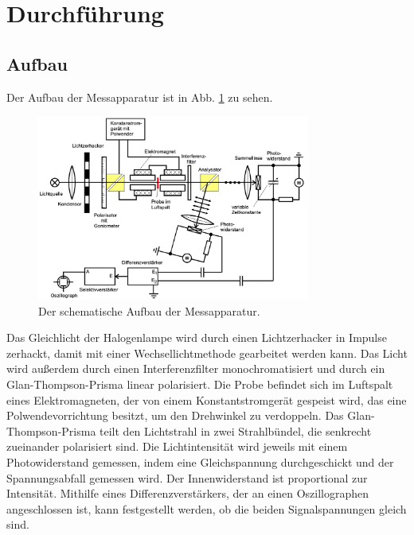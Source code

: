 \section{Durchführung}
\label{sec:Durchführung}

\subsection{Aufbau}
Der Aufbau der Messapparatur ist in Abb. \ref{fig:Aufbau} zu sehen.
\begin{figure}
    \centering
    \includegraphics[width=0.8\textwidth]{fotos/Aufbau.png}
    \caption{Der schematische Aufbau der Messapparatur. \cite{V46}}
    \label{fig:Aufbau}
\end{figure}
Das Gleichlicht der Halogenlampe wird durch einen Lichtzerhacker in Impulse zerhackt, damit mit einer Wechsellichtmethode gearbeitet werden kann. Das Licht wird außerdem durch einen Interferenzfilter monochromatisiert und durch ein Glan-Thompson-Prisma linear polarisiert. Die Probe befindet sich im Luftspalt eines Elektromagneten, der von einem Konstantstromgerät gespeist wird, das eine Polwendevorrichtung besitzt, um den Drehwinkel zu verdoppeln. Das Glan-Thompson-Prisma teilt den Lichtstrahl in zwei Strahlbündel, die senkrecht zueinander polarisiert sind. Die Lichtintensität wird jeweils mit einem Photowiderstand gemessen, indem eine Gleichspannung durchgeschickt und der Spannungsabfall gemessen wird. Der Innenwiderstand ist proportional zur Intensität. Mithilfe eines Differenzverstärkers, der an einen Oszillographen angeschlossen ist, kann festgestellt werden, ob die beiden Signalspannungen gleich sind.

